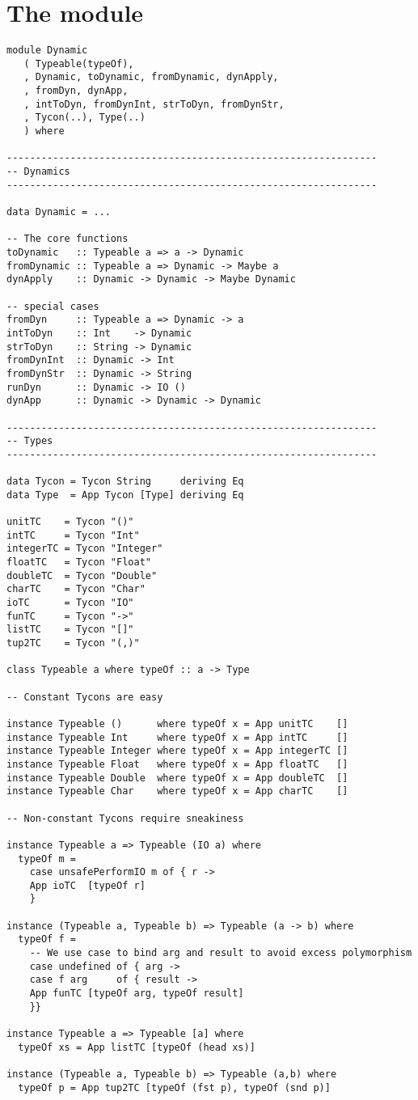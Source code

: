 \section{The  module}\label{dynamic-defn}

\begin{verbatim}
module Dynamic
   ( Typeable(typeOf),
   , Dynamic, toDynamic, fromDynamic, dynApply,
   , fromDyn, dynApp,                          
   , intToDyn, fromDynInt, strToDyn, fromDynStr,
   , Tycon(..), Type(..)
   ) where

----------------------------------------------------------------
-- Dynamics
----------------------------------------------------------------

data Dynamic = ...

-- The core functions
toDynamic   :: Typeable a => a -> Dynamic
fromDynamic :: Typeable a => Dynamic -> Maybe a
dynApply    :: Dynamic -> Dynamic -> Maybe Dynamic

-- special cases
fromDyn     :: Typeable a => Dynamic -> a
intToDyn    :: Int    -> Dynamic
strToDyn    :: String -> Dynamic
fromDynInt  :: Dynamic -> Int
fromDynStr  :: Dynamic -> String
runDyn      :: Dynamic -> IO ()
dynApp      :: Dynamic -> Dynamic -> Dynamic

----------------------------------------------------------------
-- Types
----------------------------------------------------------------

data Tycon = Tycon String     deriving Eq
data Type  = App Tycon [Type] deriving Eq

unitTC    = Tycon "()"
intTC     = Tycon "Int"
integerTC = Tycon "Integer"
floatTC   = Tycon "Float"
doubleTC  = Tycon "Double"
charTC    = Tycon "Char"
ioTC      = Tycon "IO"
funTC     = Tycon "->"
listTC    = Tycon "[]"
tup2TC    = Tycon "(,)"

class Typeable a where typeOf :: a -> Type

-- Constant Tycons are easy

instance Typeable ()      where typeOf x = App unitTC    []
instance Typeable Int     where typeOf x = App intTC     []
instance Typeable Integer where typeOf x = App integerTC []
instance Typeable Float   where typeOf x = App floatTC   []
instance Typeable Double  where typeOf x = App doubleTC  []
instance Typeable Char    where typeOf x = App charTC    []

-- Non-constant Tycons require sneakiness

instance Typeable a => Typeable (IO a) where 
  typeOf m = 
    case unsafePerformIO m of { r ->
    App ioTC  [typeOf r]
    }

instance (Typeable a, Typeable b) => Typeable (a -> b) where
  typeOf f = 
    -- We use case to bind arg and result to avoid excess polymorphism
    case undefined of { arg ->
    case f arg     of { result ->
    App funTC [typeOf arg, typeOf result]
    }}

instance Typeable a => Typeable [a] where
  typeOf xs = App listTC [typeOf (head xs)]

instance (Typeable a, Typeable b) => Typeable (a,b) where
  typeOf p = App tup2TC [typeOf (fst p), typeOf (snd p)]
\end{verbatim}


